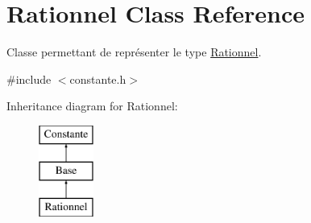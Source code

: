 \hypertarget{class_rationnel}{\section{Rationnel Class Reference}
\label{class_rationnel}
}


Classe permettant de représenter le type \hyperlink{class_rationnel}{Rationnel}.  




{\ttfamily \#include $<$constante.\-h$>$}

Inheritance diagram for Rationnel\-:\begin{figure}[H]
\begin{center}
\leavevmode
\includegraphics[height=3.000000cm]{class_rationnel}
\end{center}
\end{figure}
